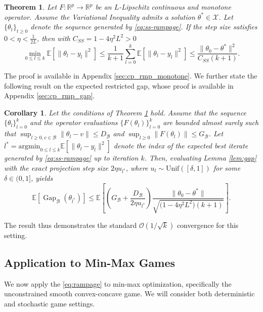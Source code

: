 \documentclass[letter,11pt]{article}
\newtheorem{theorem}{Theorem}[]
\newtheorem{corollary}{Corollary}[theorem]
\begin{document}
\begin{theorem} \label{thm:cp_rmp_monotone}
Let $F: \mathbb{R}^p \to \mathbb{R}^p$ be an $L$-Lipschitz continuous and monotone operator. Assume the Variational Inequality admits a solution $\theta^* \in \mathcal{X}$. Let $\{\theta_t\}_{t \ge 0}$ denote the sequence generated by \eqref{eq:ss-rampage}. If the step size satisfies $0 < \eta < \frac{1}{2L}$, then with $C_{SS} = 1 - 4\eta^2 L^2 > 0$
\begin{equation}
\min_{0 \le l \le k} \mathbb{E}\left[\|\theta_l - y_l\|^2\right] \le \frac{1}{k+1} \sum_{l=0}^k \mathbb{E}\left[\|\theta_l - y_l\|^2\right] \le \frac{\|\theta_0 - \theta^*\|^2}{C_{SS} (k+1)}.
\end{equation}
\end{theorem}
The proof is available in Appendix \ref{sec:cp_rmp_monotone}. We further state the following result on the expected restricted gap, whose proof is available in Appendix \ref{sec:cp_rmp_gap}.
\begin{corollary} \label{cor:cp_rmp_gap}
Let the conditions of Theorem \ref{thm:cp_rmp_monotone} hold. Assume that the sequence $\{\theta_l\}_{l=0}^k$ and the operator evaluations $\{F(\theta_l)\}_{l=0}^k$ are bounded almost surely such that $\sup_{l \ge 0, v \in \mathcal{B}} \|\theta_l - v\| \le D_{\mathcal{B}}$ and $\sup_{l \ge 0} \|F(\theta_l)\| \le G_{\mathcal{B}}$. Let $l^* = \mathrm{argmin}_{0 \le l \le k} \mathbb{E}[\|\theta_l - y_l\|^2]$ denote the index of the expected best iterate generated by \eqref{eq:ss-rampage} up to iteration $k$. Then, evaluating Lemma \ref{lem:gap} with the exact projection step size $2\eta u_{l^*}$, where $u_l\sim \mathrm{Unif}([\delta, 1])$ for some $\delta\in(0,1]$, yields
\begin{equation}
\mathbb{E}\left[\operatorname{Gap}_{\mathcal{B}}(\theta_{l^*})\right] \le \mathbb{E}\left[ \left( G_{\mathcal{B}} + \frac{D_{\mathcal{B}}}{2\eta u_{l^*}} \right) \frac{\|\theta_0 - \theta^*\|}{\sqrt{\big(1 - 4\eta^2 L^2\big)(k+1)}} \right].
\end{equation}
\end{corollary}
The result thus demonstrates the standard $\mathcal{O}(1/\sqrt{k})$ convergence for this setting.

\subsection{Application to Min-Max Games}
We now apply the \eqref{eq:rampage} to min-max optimization, specifically the unconstrained smooth convex-concave game. We will consider both deterministic and stochastic game settings.
\end{document}
